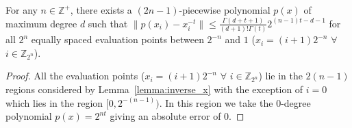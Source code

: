 \begin{duplicate}
For any $n \in \mathbb{Z}^+$, there exists a $(2n-1)$-piecewise polynomial $p(x)$ of maximum degree $d$ such that $\|p(x_i)- x_i^{-t}\| \leq \frac{\Gamma(d+t+1)}{(d+1)!\Gamma(t)}2^{(n-1)t-d-1}$ for all $2^{n}$ equally spaced evaluation points between $2^{-n}$ and $1$ ($x_i = (i+1)2^{-n}$ $\forall$ $i \in \mathbb{Z}_{2^{n}}$).
\end{duplicate}
\begin{proof}
    All the evaluation points ($x_i = (i+1)2^{-n}$ $\forall$ $i \in \mathbb{Z}_{2^{n}}$) lie in the $2(n-1)$ regions considered by Lemma~\ref{lemma:inverse_x} with the exception of $i = 0$ which lies in the region $[0, 2^{-(n-1)})$. In this region we take the 0-degree polynomial $p(x) = 2^{nt}$ giving an absolute error of 0.
\end{proof}
